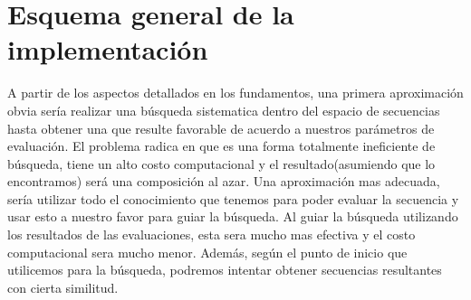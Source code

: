 \section{Esquema general de la implementación}







A partir de los aspectos detallados en los fundamentos, una primera aproximación obvia sería realizar una búsqueda sistematica dentro del espacio 
de secuencias hasta obtener una que resulte favorable de acuerdo a nuestros parámetros de evaluación.  
El problema radica en que es una forma totalmente ineficiente de búsqueda, tiene un alto costo computacional y el resultado(asumiendo que lo encontramos) será una composición al azar.
Una aproximación mas adecuada,  sería utilizar todo el conocimiento que tenemos para poder evaluar la secuencia y usar esto a nuestro favor para guiar la búsqueda. 
Al guiar la búsqueda utilizando los resultados de las evaluaciones, esta sera mucho mas efectiva y el costo computacional sera mucho menor.
Además, según el punto de inicio que utilicemos para la búsqueda, podremos intentar obtener secuencias resultantes con cierta similitud.


 


